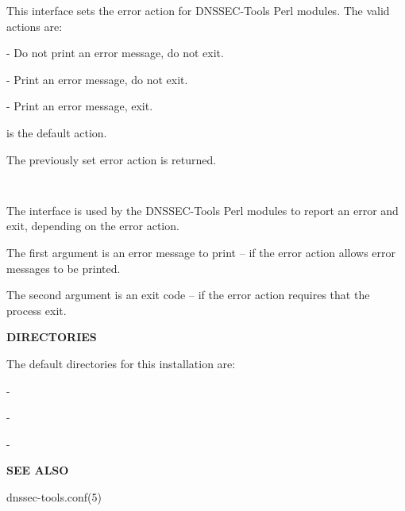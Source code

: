 \begin{description}
This interface sets the error action for DNSSEC-Tools Perl modules.
The valid actions are:

\begin{description}
\item {} - Do not print an error message, do not exit.
\item {} - Print an error message, do not exit.
\item {} - Print an error message, exit.
\end{description}

 is the default action.

The previously set error action is returned.

\item {}\verb" "

The  interface is used by the DNSSEC-Tools Perl modules to report
an error and exit, depending on the error action.

The first argument is an error message to print -- if the error action allows
error messages to be printed.

The second argument is an exit code -- if the error action requires that the
process exit.

\end{description}

{\bf DIRECTORIES}

The default directories for this installation are:

\begin{description}
\item {} -  
\item {} -  
\item {} - 
\end{description}

{\bf SEE ALSO}

dnssec-tools.conf(5)

